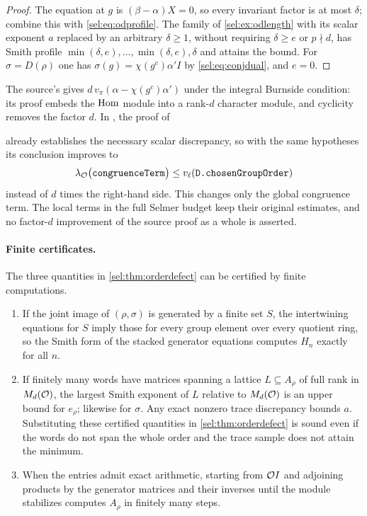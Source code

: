 \begin{proof}
The equation at $g$ is $(\beta-\alpha)X=0$, so every invariant factor is at
most $\delta$; combine this with \eqref{sel:eq:odprofile}. The family of
\cref{sel:ex:odlength} with its scalar exponent $a$ replaced by an arbitrary
$\delta\ge1$, without requiring $\delta\ge e$ or $p\nmid d$, has Smith
profile $\min(\delta,e),\dots,\min(\delta,e),\delta$ and attains the bound.
For $\sigma=D(\rho)$ one has $\sigma(g)=\chi(g^c)\alpha'I$ by
\eqref{sel:eq:conjdual}, and $e=0$.
\end{proof}

The source's  gives $d\,v_\pi(\alpha-\chi(g^c)\alpha')$
under the integral Burnside condition: its proof embeds the $\operatorname{Hom}$ module
into a rank-$d$ character module, and cyclicity removes the factor $d$. In
, the proof of
\begin{center}
\end{center}
already establishes the necessary scalar discrepancy, so with the same hypotheses its conclusion
improves to
\[
 \lambda_{\OO}\bigl(\text{\code{congruenceTerm}}\bigr)\le
 v_\ell(\text{\code{D.chosenGroupOrder}})
\]
instead of $d$ times the right-hand side. This changes only the global
congruence term. The local terms in the full Selmer budget keep their
original estimates, and no factor-$d$ improvement of the source proof as a
whole is asserted.

\paragraph{Finite certificates.}
The three quantities in \cref{sel:thm:orderdefect} can be certified by
finite computations.

\begin{proposition}\label{sel:prop:odcert}
\leavevmode
\begin{enumerate}[label=\textup{(\roman*)}]
\item If the joint image of $(\rho,\sigma)$ is generated by a finite set
 $S$, the intertwining equations for $S$ imply those for every group
 element over every quotient ring, so the Smith form of the stacked
 generator equations computes $H_n$ exactly for all $n$.
\item If finitely many words have matrices spanning a lattice
 $L\subseteq A_\rho$ of full rank in $M_d(\mathcal{O})$, the largest Smith exponent
 of $L$ relative to $M_d(\mathcal{O})$ is an upper bound for $e_\rho$; likewise for
 $\sigma$. Any exact nonzero trace discrepancy bounds $a$. Substituting
 these certified quantities in \cref{sel:thm:orderdefect} is sound even if
 the words do not span the whole order and the trace sample does not attain
 the minimum.
\item When the entries admit exact arithmetic, starting from $\mathcal{O} I$ and
 adjoining products by the generator matrices and their inverses until the
 module stabilizes computes $A_\rho$ in finitely many steps.
\end{enumerate}
\end{proposition}

